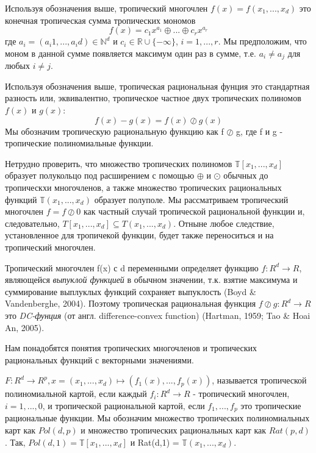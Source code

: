 \documentclass[russian]{lecture-notes}
\begin{document}
	\begin{Definition}
		Используя обозначения выше, тропический многочлен $f(x) = f(x_1,...,x_d)$ это конечная тропическая сумма тропических мономов
		\begin{equation*}
		f(x) = {c_1} x^{a_1} \oplus ... \oplus {c_r}x^{a_r}
		\end{equation*}
		где $a_i = (a_i1,...,a_id) \in \mathbb{N}^d$ и $c_i \in \mathbb{R} \cup \{- \infty\}$, $i=1,...,r$. Мы предположим, что моном в данной сумме появляется максимум один раз в сумме, т.е. $a_i \ne a_j$ для любых $i \ne j$. 
	\end{Definition}

	\begin{Definition}
		Используя обозначения выше, тропическая рациональная фунция это стандартная разность или, эквивалентно, тропическое частное двух тропических полиномов $f(x)$ и $g(x)$:
		\begin{equation*}
			f(x) - g(x) = f(x) \oslash g(x)
		\end{equation*}
		Мы обозначим тропическую рациональную функцию как f $\oslash$ g, где f и g - тропические полиномиальные функции.
	\end{Definition}

	Нетрудно проверить, что множество тропических полиномов $\mathbb{T}[x_1,...,x_d]$ образует полукольцо под расширением с помощью $\oplus$ и $\odot$ обычных до тропическхи многочленов, а также множество тропических рациональных функций $\mathbb{T}(x_1,...,x_d)$ образует полуполе. Мы рассматриваем тропический многочлен $f = f \oslash 0$ как частный случай тропической рациональной функции и, следовательно, $T[x_1,...,x_d] \subseteq T(x_1,...,x_d)$. Отныне любое следствие, установленное для тропичекой функции, будет также переноситься и на тропический многочлен.
	
	Тропический многочлен f(x) с d переменными определяет функцию $f: R^d \to R$, являющейся \textit{выпуклой функцией} в обычном значении, т.к. взятие максимума и суммирование выплуклых функций сохраняет выпуклость (Boyd \& Vandenberghe, 2004). Поэтому тропическая рациональная функция $f \oslash g : R^d \to R$ это \textit{DC-фунция} (от англ. difference-convex function) (Hartman, 1959; Tao \& Hoai An, 2005).
	
	Нам понадобятся понятия тропических многочленов и тропических рациональных функций с векторными значениями.
	
	\begin{Definition}
		$ F : R^d \to R^p, x = (x_1,...,x_d) \mapsto (f_1(x),...,f_p(x))$, называется тропической полиномиальной картой, если каждый $f_i: R^d \to R$ - тропический многочлен, $i = 1,...,0$, и тропической рациональной картой, если $f_1,...,f_p$ это тропические рациональные функции. Мы обозначим множество тропических полиномиальных карт как $Pol(d, p)$ и множество тропических рациональных карт как $Rat(p, d)$. Так, $Pol(d,1) = \mathbb{T}[x_1,...,x_d]$ и Rat(d,1) = $\mathbb{T}(x_1,...,x_d)$.
	\end{Definition} 
\end{document}

